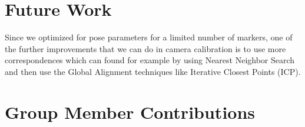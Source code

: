 \documentclass[10pt,twocolumn,letterpaper]{article}
\begin{document}
\section{Future Work}
Since we optimized for pose parameters for a limited number of markers, one of the further improvements that we can do in camera calibration is to use more correspondences which can found for example by using Nearest Neighbor Search and then use the Global Alignment techniques like Iterative Closest Points (ICP).

\section{Group Member Contributions}

{\small


}
\end{document}
